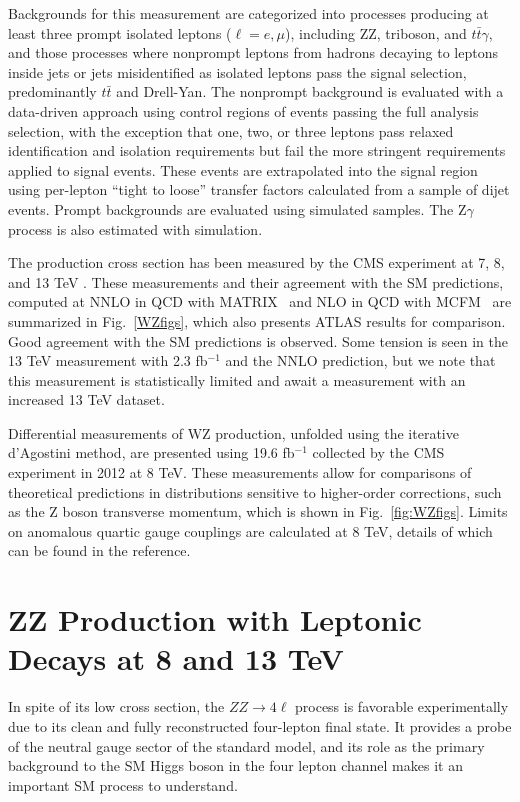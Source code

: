 \documentclass[10pt]{article}
\begin{document}
Backgrounds for this measurement are categorized into processes producing at least
three prompt isolated leptons ($\ell = e, \mu$), including ZZ, triboson, and 
$t\bar{t}\gamma$, and those processes where nonprompt
leptons from hadrons decaying to leptons inside jets or jets misidentified as isolated
leptons pass the signal selection, predominantly $t\bar{t}$ and Drell-Yan. 
The nonprompt background is evaluated with a data-driven approach using 
control regions of events passing the full analysis selection,
with the exception that one, two, or three leptons pass relaxed identification 
and isolation requirements but fail the more stringent requirements applied to signal events.
These events are extrapolated into the signal region using per-lepton 
``tight to loose'' transfer factors
calculated from a sample of dijet events. Prompt backgrounds are evaluated using 
simulated samples. The Z$\gamma$ process is also estimated with simulation.


The production cross section has been measured by the CMS experiment at 7, 8, 
\cite{Khachatryan:2016poo}
and 13 TeV
\cite{Khachatryan:2016tgp}.
These measurements and their agreement with the SM
predictions, computed at NNLO in QCD with MATRIX~\cite{Grazzini:2016swo} and NLO in 
QCD with MCFM~\cite{Campbell:2011bn}
are summarized in Fig.~\ref{WZfigs}, which also presents ATLAS results for comparison. 
Good agreement with the SM predictions
is observed. Some tension is seen in the 13 TeV measurement with 2.3 fb$^{-1}$
and the NNLO prediction, but we note that this measurement is statistically
limited and await a measurement with an increased 13 TeV dataset.

Differential measurements of WZ production, unfolded using the 
iterative d'Agostini \cite{DAgostini:1994fjx} method, are presented using 19.6 fb$^{-1}$
collected by the CMS experiment in 2012 at 8 TeV. These measurements allow for
comparisons of theoretical predictions in distributions sensitive 
to higher-order corrections, such as the Z boson transverse momentum, which is
shown in Fig.~\ref{fig:WZfigs}. Limits on anomalous quartic gauge couplings are
calculated at 8 TeV, details of which can be found in the reference.


\section{ZZ Production with Leptonic Decays at 8 and 13 TeV}

In spite of its low cross section, the $ZZ \rightarrow 4\ell$ process 
is favorable experimentally due to its clean and fully reconstructed 
four-lepton final state. It provides a probe of the neutral gauge sector 
of the standard model, and its role as the primary background to the SM Higgs
boson in the four lepton channel makes it an important SM 
process to understand.
\end{document}
